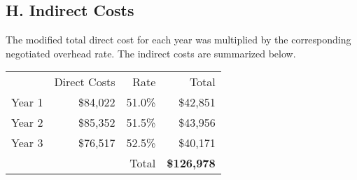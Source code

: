 \subsection*{H. Indirect Costs}

\noindent The modified total direct cost for each year was multiplied by the corresponding negotiated overhead rate. The indirect costs are summarized below.
\newline
\newline
\begin{table}[H]
\begin{tabular}[c]{r r r | r}
        & Direct Costs  & Rate      & Total\\
Year 1  & \$84,022      & 51.0\%    & \$42,851\\
Year 2  & \$85,352      & 51.5\%    & \$43,956\\ 
Year 3  & \$76,517      & 52.5\%    & \$40,171\\
\hline
        &               & Total     & \textbf{\$126,978}
\end{tabular}
\end{table}